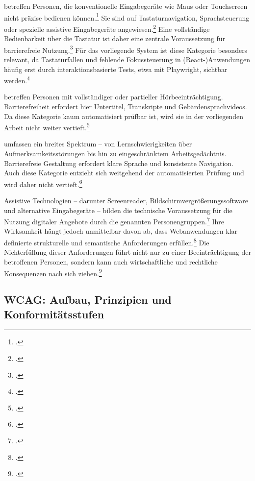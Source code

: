  betreffen Personen, die konventionelle Eingabegeräte wie Maus oder Touchscreen nicht präzise bedienen können.\footcite[Vgl.][S. 110381--110382]{perezLongitudinalStudyTwo2020} Sie sind auf Tastaturnavigation, Sprach\-steuerung oder spezielle assistive Eingabegeräte angewiesen.\footcite[Vgl.][S. 208]{kouroupetroglouAssistiveTechnologiesComputer01} Eine vollständige Bedienbarkeit über die Tastatur ist daher eine zentrale Voraussetzung für barrierefreie Nutzung.\footcite[Vgl.][]{WebAIMKeyboardAccessibility} Für das vorliegende System ist diese Kategorie besonders relevant, da Tastaturfallen und fehlende Fokus\-steuerung in (React-)Anwendungen häufig erst durch interaktionsbasierte Tests, etwa mit Playwright, sichtbar werden.\footcite[Vgl.][S. 855]{chiou_detecting_2021}

 betreffen Personen mit vollständiger oder partieller Hörbeeinträchtigung. Barrierefreiheit erfordert hier Untertitel, Transkripte und Gebärdensprachvideos. Da diese Kategorie kaum automatisiert prüfbar ist, wird sie in der vorliegenden Arbeit nicht weiter vertieft.\footcite[Vgl.][]{abou-zahra_artificial_2018}

 umfassen ein breites Spektrum -- von Lernschwierigkeiten über Aufmerksamkeitsstörungen bis hin zu eingeschränktem Arbeitsgedächtnis. Barrierefreie Gestaltung erfordert klare Sprache und konsistente Navigation. Auch diese Kategorie entzieht sich weitgehend der automatisierten Prüfung und wird daher nicht vertieft.\footcite[Vgl.][]{abou-zahra_artificial_2018}

Assistive Technologien -- darunter Screenreader, Bildschirmvergrößerungssoftware und alternative Eingabegeräte -- bilden die technische Voraussetzung für die Nutzung digitaler Angebote durch die genannten Personengruppen.\footcite[Vgl.][]{WAI, abou-zahra_artificial_2018} Ihre Wirksamkeit hängt jedoch unmittelbar davon ab, dass Webanwendungen klar definierte strukturelle und semantische Anforderungen erfüllen.\footcite[Vgl.][S. 82]{morrisonImaginingArtificialIntelligence2017} Die Nichterfüllung dieser Anforderungen führt nicht nur zu einer Beeinträchtigung der betroffenen Personen, sondern kann auch wirtschaftliche und rechtliche Konsequenzen nach sich ziehen.\footcite[Vgl.][S. 864--865]{krok_digital_2024}

\subsection{\acs{WCAG}: Aufbau, Prinzipien und Konformitätsstufen}

